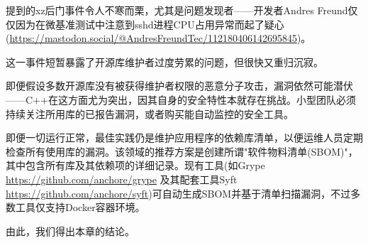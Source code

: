 提到的xz后门事件令人不寒而栗，尤其是问题发现者——开发者Andres Freund仅仅因为在微基准测试中注意到sshd进程CPU占用异常而起了疑心(\url{https://mastodon.social/@AndresFreundTec/112180406142695845})。

这一事件短暂暴露了开源库维护者过度劳累的问题，但很快又重归沉寂。

即便假设多数开源库没有被获得维护者权限的恶意分子攻击，漏洞依然可能潜伏——C++在这方面尤为突出，因其自身的安全特性本就存在挑战。小型团队必须持续关注所用库的已报告漏洞，或者购买能自动监控的安全工具。

即便一切运行正常，最佳实践仍是维护应用程序的依赖库清单，以便运维人员定期检查所有使用库的漏洞。该领域的推荐方案是创建所谓"软件物料清单(SBOM)"，其中包含所有库及其依赖项的详细记录。现有工具(如Grype \url{https://github.com/anchore/grype} 及其配套工具Syft \url{https://github.com/anchore/syft})可自动生成SBOM并基于清单扫描漏洞，不过多数工具仅支持Docker容器环境。

由此，我们得出本章的结论。







